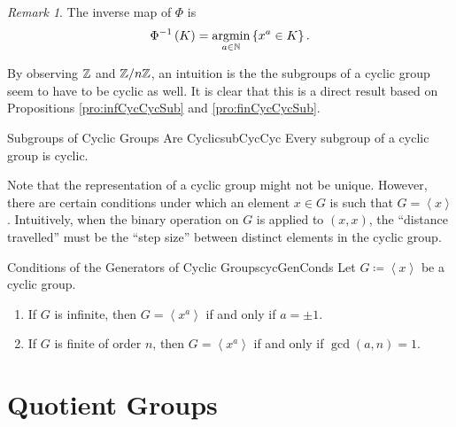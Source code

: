 \documentclass[math]{amznotes}
\theoremstyle{remark}
\newtheorem*{remark}{Remark}
\newcommand{\0}{\mathbf{0}}
\newcommand{\1}{\mathbf{1}}
\DeclareMathOperator*{\argmin}{argmin}
\begin{document}
\begin{notebox}
    \begin{remark}
        The inverse map of $\Phi$ is 
        \begin{equation*}
            \Phi^{-1}\left(K\right) = \argmin_{a \in \N}\left\{x^a \in K\right\}.
        \end{equation*}
    \end{remark}
\end{notebox}
By observing $\mathbb{Z}$ and $\mathbb{Z} \slash n\mathbb{Z}$, an intuition is the the subgroups of a cyclic group seem to have to be cyclic as well. It is clear that this is a direct result based on Propositions \ref{pro:infCycCycSub} and \ref{pro:finCycCycSub}.
\begin{probox}{Subgroups of Cyclic Groups Are Cyclic}{subCycCyc}
    Every subgroup of a cyclic group is cyclic.
\end{probox}
Note that the representation of a cyclic group might not be unique. However, there are certain conditions under which an element $x \in G$ is such that $G = \left\langle x \right\rangle$. Intuitively, when the binary operation on $G$ is applied to $\left(x, x\right)$, the ``distance travelled'' must be the ``step size'' between distinct elements in the cyclic group.
\begin{probox}{Conditions of the Generators of Cyclic Groups}{cycGenConds}
    Let $G \coloneqq \left\langle x \right\rangle$ be a cyclic group.
    \begin{enumerate}
        \item If $G$ is infinite, then $G = \left\langle x^a \right\rangle$ if and only if $a = \pm 1$.
        \item If $G$ is finite of order $n$, then $G = \left\langle x^a \right\rangle$ if and only if $\gcd\left(a, n\right) = 1$.
    \end{enumerate}
\end{probox}

\chapter{Quotient Groups}
\end{document}
